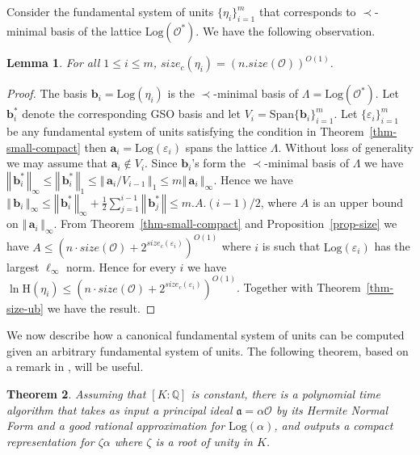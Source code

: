 \documentclass{article}
\newcommand{\height}[1]{\mathrm{H}\left(#1\right)}
\newcommand{\Log}[1]{\mathrm{Log}\left(#1\right)}
\renewcommand{\O}{\mathcal{O}}
\newcommand{\Ideal}[1]{\ensuremath{\mathfrak{#1}}}
\newtheorem{theorem}{Theorem}[section]
\newtheorem{lemma}[theorem]{Lemma}
\theoremstyle{definition}\newtheorem{remark}[theorem]{Remark}
\newcommand {\norm} [1] {\ensuremath {\left\Vert\,#1\,\right\Vert}}
\renewcommand{\vector}[1]{\ensuremath{\mathbf{#1}}}
\begin{document}
Consider the fundamental system of  units $\{ \eta_i \}_{i=1}^m$ that
corresponds to $\prec$-minimal basis of the lattice
$\Log{\mathcal{O}^*}$. We have the following observation.

\begin{lemma}
  For all $ 1 \leq i \leq m$, $size_c(\eta_i) =
  (n.size(\mathcal{O}))^{O(1)}$.
\end{lemma}
\begin{proof}
  The basis $\vector{b}_i = \Log{\eta_i}$ is the $\prec$-minimal basis
  of $\Lambda = \Log{\mathcal{O}^*}$. Let $\vector{b}_i^*$ denote the
  corresponding GSO basis and let $V_i =
  \mathrm{Span}\{\vector{b}_i\}_{i=1}^m$.  Let $\{ \varepsilon_i
  \}_{i=1}^m$ be any fundamental system of units satisfying the condition
  in Theorem~\ref{thm-small-compact} then $\vector{a}_i =
  \Log{\varepsilon_i}$ spans the lattice $\Lambda$. Without loss of
  generality we may assume that $\vector{a}_i \not \in V_i$. Since
  $\vector{b}_i$'s form the $\prec$-minimal basis of $\Lambda$ we have
  $\norm{\vector{b}_i^*}_\infty \leq \norm{\vector{b}_i^*}_1 \leq
  \norm{\vector{a}_i/V_{i-1}}_1 \leq m \norm{\vector{a}_i}_\infty$.
  Hence we have $\norm{\vector{b}_i}_\infty \leq \norm{\vector{b}_i^*
  }_\infty + \frac{1}{2} \sum_{j=1}^{i-1} \norm{\vector{b}_j^*} \leq
  m.A.(i-1)/2$, where $A$ is an upper bound on
  $\norm{\vector{a}_i}_\infty$. {From} Theorem~\ref{thm-small-compact}
  and Proposition~\ref{prop-size} we have $A \leq (n\cdot
  size(\mathcal{O}) + 2^{size_c(\varepsilon_i)})^{O(1)}$ where $i$ is
  such that $\Log{\varepsilon_i}$ has the largest $\ell_\infty$ norm.
  Hence for every $i$ we have $\ln \height{\eta_i} \leq (n\cdot
  size(\mathcal{O}) + 2^{size_c(\varepsilon_i)})^{O(1)}$. Together
  with Theorem~\ref{thm-size-ub} we have the result.
\end{proof}

We now describe how a canonical fundamental system of units can be
computed given an arbitrary fundamental system of units. The following
theorem, based on a remark in \cite{thiel94class}, will be useful.

\begin{theorem}{\rm\cite{thiel94class}}\label{thm-compute-compact}
  Assuming that $[K:\mathbb{Q}]$ is constant, there is a polynomial
  time algorithm that takes as input a principal ideal
  $\Ideal{a}=\alpha\O$ by its Hermite Normal Form and a good rational
  approximation for $\Log{\alpha}$, and outputs a compact
  representation for $\zeta\alpha$ where $\zeta$ is a root of unity in
  $K$.
\end{theorem}
\end{document}
